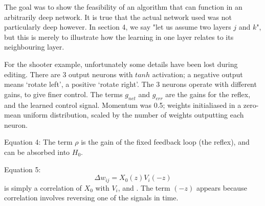 \documentclass{article}
\begin{document}
	
	The goal was to show the feasibility of an algorithm that can function in an arbitrarily deep network. It is true that the actual network used was not particularly deep however. In section 4, we say "let us assume two layers $j$ and $k$", but this is merely to illustrate how the learning in one layer relates to its neighbouring layer.  
	
	For the shooter example, unfortunately some details have been lost during editing. There are 3 output neurons with $tanh$ activation; a negative output means ‘rotate left’, a positive ‘rotate right’. The 3 neurons operate with different gains, to give finer control. The terms $g_{net}$ and $g_{err}$ are the gains for the reflex, and the learned control signal.
	Momentum was 0.5; weights initialiased in a zero-mean uniform distribution, scaled by the number of weights outputting each neuron.
	
Equation 4: The term $\rho$ is the gain of the fixed feedback loop (the reflex), and can be absorbed into $H_{0}$. 
	
	
Equation 5:
\begin{equation}
\Delta w_{ij} = X_0(z) V_i(-z) \nonumber
\end{equation}
is simply a correlation of $X_{0}$ with $V_{i}$, and . The term $(-z)$ appears because correlation involves reversing one of the signals in time. 

	
\end{document}
